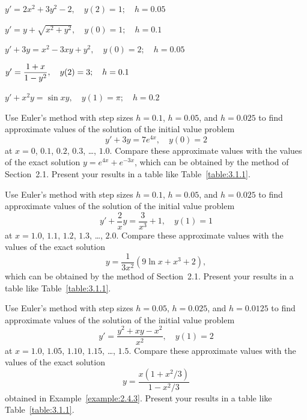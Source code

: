 \begin{exerciselist}
  \item\label{exer:3.1.1} \Cex $y'=2x^{2}+3y^{2}-2,\quad y(2)=1;\quad h=0.05$

  \item\label{exer:3.1.2} \Cex $y'=y+\sqrt{x^{2}+y^{2}},\quad y(0)=1;\quad h=0.1$

  \item\label{exer:3.1.3} \Cex $y'+3y=x^{2}-3xy+y^{2},\quad y(0)=2;\quad h=0.05$

  \item\label{exer:3.1.4} \Cex $y'=\displaystyle\frac{1+x}{1-y^{2}},\quad y(2)=3;\quad h=0.1$

  \item\label{exer:3.1.5} \Cex $y'+x^{2}y=\sin xy,\quad y(1)=\pi;\quad h=0.2$

  \item\label{exer:3.1.6} \Cex Use Euler's method with step sizes $h=0.1$, $h=0.05$, and $h=0.025$
        to find approximate values of the solution of the initial value problem
  \[
    y'+3y=7e^{4x},\quad y(0)=2
  \]
  at $x=0$, $0.1$, $0.2$, $0.3$, \dots, $1.0$. Compare these approximate values with the values of
  the exact solution $y=e^{4x}+e^{-3x}$, which can be obtained by the method of Section~2.1. Present
  your results in a table like Table~\ref{table:3.1.1}.

  \item\label{exer:3.1.7} \Cex Use Euler's method with step sizes $h=0.1$, $h=0.05$, and $h=0.025$
        to find approximate values of the solution of the initial value problem
  \[
    y'+\frac{2}{x}y=\frac{3}{x^{3}}+1,\quad y(1)=1
  \]
  at $x=1.0$, $1.1$, $1.2$, $1.3$, \dots, $2.0$. Compare these approximate values with the values of
  the exact solution
  \[
    y=\frac{1}{3x^{2}}(9\ln x+x^{3}+2),
  \]
  which can be obtained by the method of Section~2.1. Present your results in a table like
  Table~\ref{table:3.1.1}.

  \item\label{exer:3.1.8} \Cex Use Euler's method with step sizes $h=0.05$, $h=0.025$, and
        $h=0.0125$ to find approximate values of the solution of the initial value problem
  \[
    y'=\frac{y^{2}+xy-x^{2}}{x^{2}},\quad y(1)=2
  \]
  at $x=1.0$, $1.05$, $1.10$, $1.15$, \dots, $1.5$. Compare these approximate values with the values
  of the exact solution
  \[
    y=\frac{x(1+x^{2}/3)}{1-x^{2}/3}
  \]
  obtained in Example~\ref{example:2.4.3}. Present your results in a table like
  Table~\ref{table:3.1.1}.


\end{exerciselist}
